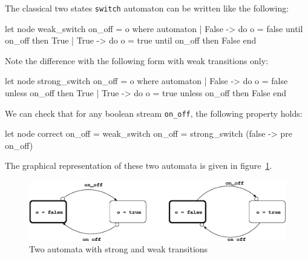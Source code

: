 \documentclass[11pt,titlepage,twoside]{report}
\begin{document}
The classical two states \verb-switch- automaton can be written like
the following:
\begin{chklisting}
let node weak_switch on_off = o where
  automaton
  | False -> do o = false until on_off then True
  | True -> do o = true until on_off then False
  end
\end{chklisting}

Note the difference with the following form with weak transitions only:
\begin{chklisting}[continue]
let node strong_switch on_off = o where
  automaton
  | False -> do o = false unless on_off then True
  | True -> do o = true unless on_off then False
  end
\end{chklisting}

We can check that for any boolean stream \verb-on_off-, the following
property holds:
\begin{chklisting}
let node correct on_off =
weak_switch on_off = strong_switch (false -> pre on_off)
\end{chklisting}
The graphical representation of these two automata is given in
figure~\cref{switch-figure}.

\begin{figure}
\begin{center}
\includegraphics[width=\textwidth]{Fig/automaton}
\end{center}
\caption{Two automata with strong and weak transitions~\label{switch-figure}}
\end{figure}

%
\end{document}
